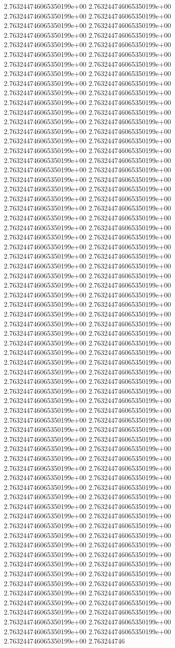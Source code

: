2.763244746065350199e+00	2.763244746065350199e+00	2.763244746065350199e+00	2.763244746065350199e+00	2.763244746065350199e+00	2.763244746065350199e+00	2.763244746065350199e+00	2.763244746065350199e+00	2.763244746065350199e+00	2.763244746065350199e+00	2.763244746065350199e+00	2.763244746065350199e+00	2.763244746065350199e+00	2.763244746065350199e+00	2.763244746065350199e+00	2.763244746065350199e+00	2.763244746065350199e+00	2.763244746065350199e+00	2.763244746065350199e+00	2.763244746065350199e+00	2.763244746065350199e+00	2.763244746065350199e+00	2.763244746065350199e+00	2.763244746065350199e+00	2.763244746065350199e+00	2.763244746065350199e+00	2.763244746065350199e+00	2.763244746065350199e+00	2.763244746065350199e+00	2.763244746065350199e+00	2.763244746065350199e+00	2.763244746065350199e+00	2.763244746065350199e+00	2.763244746065350199e+00	2.763244746065350199e+00	2.763244746065350199e+00	2.763244746065350199e+00	2.763244746065350199e+00	2.763244746065350199e+00	2.763244746065350199e+00	2.763244746065350199e+00	2.763244746065350199e+00	2.763244746065350199e+00	2.763244746065350199e+00	2.763244746065350199e+00	2.763244746065350199e+00	2.763244746065350199e+00	2.763244746065350199e+00	2.763244746065350199e+00	2.763244746065350199e+00	2.763244746065350199e+00	2.763244746065350199e+00	2.763244746065350199e+00	2.763244746065350199e+00	2.763244746065350199e+00	2.763244746065350199e+00	2.763244746065350199e+00	2.763244746065350199e+00	2.763244746065350199e+00	2.763244746065350199e+00	2.763244746065350199e+00	2.763244746065350199e+00	2.763244746065350199e+00	2.763244746065350199e+00	2.763244746065350199e+00	2.763244746065350199e+00	2.763244746065350199e+00	2.763244746065350199e+00	2.763244746065350199e+00	2.763244746065350199e+00	2.763244746065350199e+00	2.763244746065350199e+00	2.763244746065350199e+00	2.763244746065350199e+00	2.763244746065350199e+00	2.763244746065350199e+00	2.763244746065350199e+00	2.763244746065350199e+00	2.763244746065350199e+00	2.763244746065350199e+00	2.763244746065350199e+00	2.763244746065350199e+00	2.763244746065350199e+00	2.763244746065350199e+00	2.763244746065350199e+00	2.763244746065350199e+00	2.763244746065350199e+00	2.763244746065350199e+00	2.763244746065350199e+00	2.763244746065350199e+00	2.763244746065350199e+00	2.763244746065350199e+00	2.763244746065350199e+00	2.763244746065350199e+00	2.763244746065350199e+00	2.763244746065350199e+00	2.763244746065350199e+00	2.763244746065350199e+00	2.763244746065350199e+00	2.763244746065350199e+00	2.763244746065350199e+00	2.763244746065350199e+00	2.763244746065350199e+00	2.763244746065350199e+00	2.763244746065350199e+00	2.763244746065350199e+00	2.763244746065350199e+00	2.763244746065350199e+00	2.763244746065350199e+00	2.763244746065350199e+00	2.763244746065350199e+00	2.763244746065350199e+00	2.763244746065350199e+00	2.763244746065350199e+00	2.763244746065350199e+00	2.763244746065350199e+00	2.763244746065350199e+00	2.763244746065350199e+00	2.763244746065350199e+00	2.763244746065350199e+00	2.763244746065350199e+00	2.763244746065350199e+00	2.763244746065350199e+00	2.763244746065350199e+00	2.763244746065350199e+00	2.763244746065350199e+00	2.763244746065350199e+00	2.763244746065350199e+00	2.763244746065350199e+00	2.763244746065350199e+00	2.763244746065350199e+00	2.763244746065350199e+00	2.763244746065350199e+00	2.763244746